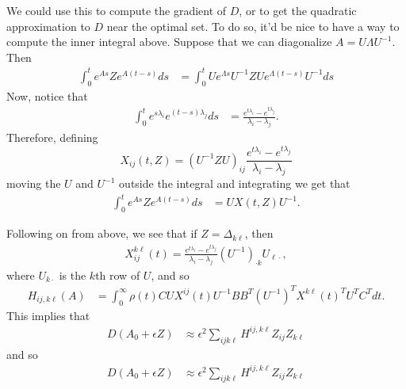 \documentclass{article}
\newcommand{\1}{\mathbbm{1}}
\begin{document}
We could use this to compute the gradient of $D$,
or to get the quadratic approximation to $D$ near the optimal set.
To do so, it'd be nice to have a way to compute the inner integral above.
Suppose that we can diagonalize $A = U \Lambda U^{-1}$.
Then
\begin{equation} \label{eqn:exp_deriv}
  \begin{aligned}
      \int_0^t e^{As} Z e^{A(t-s)} ds 
      &=
      \int_0^t U e^{\Lambda s} U^{-1} Z U e^{\Lambda (t-s)} U^{-1} ds 
  \end{aligned}
\end{equation}
Now, notice that
\begin{equation}
  \begin{aligned}
      \int_0^t e^{s \lambda_i} e^{(t-s) \lambda_j} ds
      &=
      \frac{ e^{t \lambda_i} - e^{t \lambda_j} }{ \lambda_i - \lambda_j } .
  \end{aligned}
\end{equation}
Therefore, 
defining
\begin{equation}
    X_{ij}(t,Z) = \left( U^{-1} Z U \right)_{ij}
      \frac{ e^{t \lambda_i} - e^{t \lambda_j} }{ \lambda_i - \lambda_j } 
\end{equation}
moving the $U$ and $U^{-1}$ outside the integral and integrating we get that
\begin{equation}
  \begin{aligned}
      \int_0^t e^{As} Z e^{A(t-s)} ds 
      &=
      U X(t,Z) U^{-1} .
  \end{aligned}
\end{equation}

Following on from above, we see that if $Z=\Delta_{k \ell}$, then
\begin{equation}
  \begin{aligned}
      X_{ij}^{k\ell}(t) = 
      \frac{ e^{t \lambda_i} - e^{t \lambda_j} }{ \lambda_i - \lambda_j } 
      (U^{-1})_{\cdot k} U_{\ell \cdot},
  \end{aligned}
\end{equation}
where $U_{k \cdot}$ is the $k$th row of $U$,
and so
\begin{equation}
    \begin{aligned}
        H_{ij, k\ell}(A)
        &=
        \int_0^\infty
            \rho(t) C U X^{ij}(t) U^{-1} B B^T (U^{-1})^T X^{k\ell}(t)^T U^T C^T
        dt .
    \end{aligned}
\end{equation}
This implies that
\begin{equation}
    \begin{aligned}
        D(A_0+\epsilon Z)
        &\approx \epsilon^2\sum_{ijk\ell} H^{ij,k\ell} Z_{ij} Z_{k\ell} 
    \end{aligned}
\end{equation}
and so
\begin{equation}
    \begin{aligned}
        D(A_0+\epsilon Z)
        &\approx \epsilon^2\sum_{ijk\ell} H^{ij,k\ell} Z_{ij} Z_{k\ell} 
    \end{aligned}
\end{equation}
\end{document}
